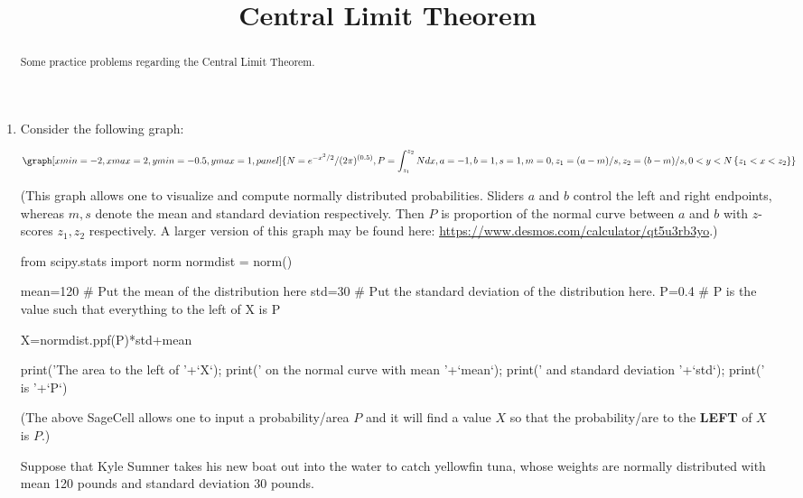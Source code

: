 \documentclass{ximera}
\title{Central Limit Theorem}
\begin{document}
    
 \begin{abstract}
 Some practice problems regarding the Central Limit Theorem.
 \end{abstract}   
    
      
      
\maketitle
      
 
\begin{enumerate}

\item Consider the following graph:

\begin{onlineOnly}
$$\graph[xmin=-2,xmax=2,ymin=-0.5,ymax=1, panel]{N=e^{-x^2/2}/(2\pi)^{(0.5)}, P=\int_{z_1}^{z_2} N dx, a=-1, b=1, s=1, m=0, z_1=(a-m)/s, z_2=(b-m)/s, 0<y<N\left\{z_1<x<z_2\right\}}$$
\end{onlineOnly}
(This graph allows one to visualize and compute normally distributed probabilities.  Sliders $a$ and $b$ control the left and right endpoints, whereas $m, s$ denote the mean and standard deviation respectively.  Then $P$ is proportion of the normal curve between $a$ and $b$ with $z$-scores $z_1, z_2$ respectively.  A larger version of this graph may be found here: \url{https://www.desmos.com/calculator/qt5u3rb3yo}.)


\begin{sageCell}
from scipy.stats import norm
normdist = norm()

mean=120 # Put the mean of the distribution here
std=30  # Put the standard deviation of the distribution here.
P=0.4  # P is the value such that everything to the left of X is P



X=normdist.ppf(P)*std+mean

print('The area to the left of '+`X`); print(' on the normal curve with mean '+`mean`); print(' and standard deviation '+`std`); print(' is  '+`P`)
\end{sageCell}
(The above SageCell allows one to input a probability/area $P$ and it will find a value $X$ so that the probability/are to the \textbf{LEFT} of $X$ is $P$.)



\begin{problem}
Suppose that Kyle Sumner takes his new boat out into the water to catch yellowfin tuna, whose weights are normally distributed with mean 120 pounds and standard deviation 30 pounds.  


\end{problem}
\end{enumerate}
\end{document}
